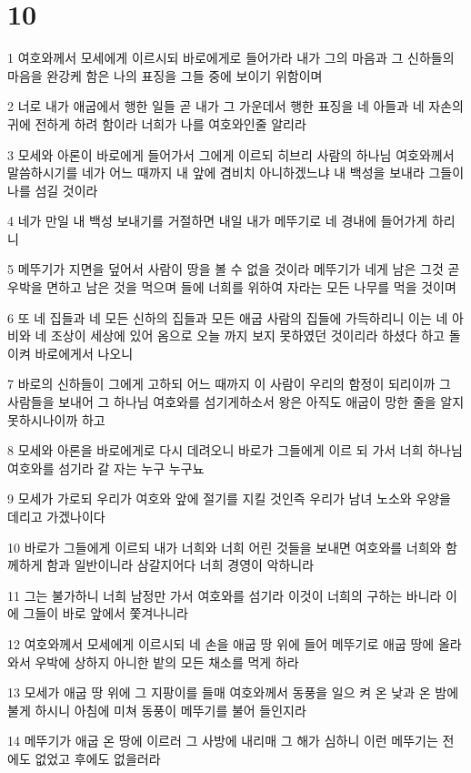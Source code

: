 \chapter{10}

\par 1 여호와께서 모세에게 이르시되 바로에게로 들어가라 내가 그의 마음과 그 신하들의 마음을 완강케 함은 나의 표징을 그들 중에 보이기 위함이며
\par 2 너로 내가 애굽에서 행한 일들 곧 내가 그 가운데서 행한 표징을 네 아들과 네 자손의 귀에 전하게 하려 함이라 너희가 나를 여호와인줄 알리라
\par 3 모세와 아론이 바로에게 들어가서 그에게 이르되 히브리 사람의 하나님 여호와께서 말씀하시기를 네가 어느 때까지 내 앞에 겸비치 아니하겠느냐 내 백성을 보내라 그들이 나를 섬길 것이라
\par 4 네가 만일 내 백성 보내기를 거절하면 내일 내가 메뚜기로 네 경내에 들어가게 하리니
\par 5 메뚜기가 지면을 덮어서 사람이 땅을 볼 수 없을 것이라 메뚜기가 네게 남은 그것 곧 우박을 면하고 남은 것을 먹으며 들에 너희를 위하여 자라는 모든 나무를 먹을 것이며
\par 6 또 네 집들과 네 모든 신하의 집들과 모든 애굽 사람의 집들에 가득하리니 이는 네 아비와 네 조상이 세상에 있어 옴으로 오늘 까지 보지 못하였던 것이리라 하셨다 하고 돌이켜 바로에게서 나오니
\par 7 바로의 신하들이 그에게 고하되 어느 때까지 이 사람이 우리의 함정이 되리이까 그 사람들을 보내어 그 하나님 여호와를 섬기게하소서 왕은 아직도 애굽이 망한 줄을 알지 못하시나이까 하고
\par 8 모세와 아론을 바로에게로 다시 데려오니 바로가 그들에게 이르 되 가서 너희 하나님 여호와를 섬기라 갈 자는 누구 누구뇨
\par 9 모세가 가로되 우리가 여호와 앞에 절기를 지킬 것인즉 우리가 남녀 노소와 우양을 데리고 가겠나이다
\par 10 바로가 그들에게 이르되 내가 너희와 너희 어린 것들을 보내면 여호와를 너희와 함께하게 함과 일반이니라 삼갈지어다 너희 경영이 악하니라
\par 11 그는 불가하니 너희 남정만 가서 여호와를 섬기라 이것이 너희의 구하는 바니라 이에 그들이 바로 앞에서 쫓겨나니라
\par 12 여호와께서 모세에게 이르시되 네 손을 애굽 땅 위에 들어 메뚜기로 애굽 땅에 올라와서 우박에 상하지 아니한 밭의 모든 채소를 먹게 하라
\par 13 모세가 애굽 땅 위에 그 지팡이를 들매 여호와께서 동풍을 일으 켜 온 낮과 온 밤에 불게 하시니 아침에 미쳐 동풍이 메뚜기를 불어 들인지라
\par 14 메뚜기가 애굽 온 땅에 이르러 그 사방에 내리매 그 해가 심하니 이런 메뚜기는 전에도 없었고 후에도 없을러라

